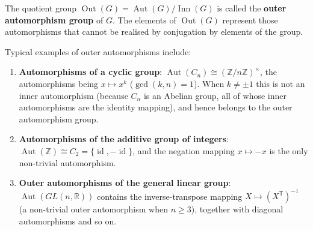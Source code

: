 \begin{definition}\label{def:group_scaling_operation}
The quotient group $\operatorname{Out}(G) = \operatorname{Aut}(G) / \operatorname{Inn}(G)$ is called the \textbf{outer automorphism group} of $G$. The elements of $\operatorname{Out}(G)$ represent those automorphisms that cannot be realised by conjugation by elements of the group.

Typical examples of outer automorphisms include:
\begin{enumerate}[label=(\roman*)]
    \item \textbf{Automorphisms of a cyclic group}: $\operatorname{Aut}(C_n) \cong (\mathbb{Z}/n\mathbb{Z})^\times$, the automorphisms being $x \mapsto x^k$ ($\gcd(k,n)=1$). When $k \neq \pm 1$ this is not an inner automorphism (because $C_n$ is an Abelian group, all of whose inner automorphisms are the identity mapping), and hence belongs to the outer automorphism group.
    \item \textbf{Automorphisms of the additive group of integers}: $\operatorname{Aut}(\mathbb{Z}) \cong C_2 = \{\operatorname{id}, -\operatorname{id}\}$, and the negation mapping $x \mapsto -x$ is the only non-trivial automorphism.
    \item \textbf{Outer automorphisms of the general linear group}: $\operatorname{Aut}(GL(n,\mathbb{R}))$ contains the inverse-transpose mapping $X \mapsto (X^{\mathsf T})^{-1}$ (a non-trivial outer automorphism when $n \ge 3$), together with diagonal automorphisms and so on.
\end{enumerate}
\end{definition}

